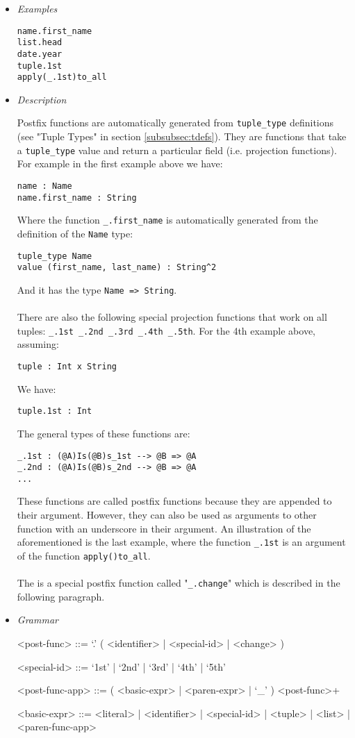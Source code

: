 \documentclass{article}
\begin{document}
\begin{itemize}

\item \textit{Examples}
\begin{verbatim}
name.first_name
list.head
date.year
tuple.1st
apply(_.1st)to_all
\end{verbatim}

\item \textit{Description} 

Postfix functions are automatically generated from \texttt{tuple_type}
definitions (see "Tuple Types" in section \ref{subsubsec:tdefs}). They are
functions that take a \texttt{tuple_type} value and return a particular field
(i.e. projection functions). For example in the first example above we have:
\begin{verbatim}
name : Name
name.first_name : String
\end{verbatim}
Where the function \texttt{_.first_name} is automatically generated from the
definition of the \texttt{Name} type:
\begin{verbatim}
tuple_type Name
value (first_name, last_name) : String^2
\end{verbatim}
And it has the type \texttt{Name => String}.
\\\\
There are also the following special projection functions that work on all tuples:
\texttt{_.1st _.2nd _.3rd _.4th _.5th}.
For the 4th example above, assuming:
\begin{verbatim}
tuple : Int x String
\end{verbatim}
We have:
\begin{verbatim}
tuple.1st : Int
\end{verbatim}
The general types of these functions are:
\begin{verbatim}
_.1st : (@A)Is(@B)s_1st --> @B => @A
_.2nd : (@A)Is(@B)s_2nd --> @B => @A
...
\end{verbatim}
These functions are called postfix functions because they are appended to their
argument. However, they can also be used as arguments to other function with an
underscore in their argument.  An illustration of the aforementioned is the
last example, where the function \texttt{_.1st} is an argument of the function
\texttt{apply()to_all}.
\\\\
The is a special postfix function called "\texttt{_.change}" which is described in
the following paragraph.

\item \textit{Grammar}
\begin{grammar}
<post-func> ::= `.' ( <identifier> | <special-id> | <change> )

<special-id> ::= `1st' | `2nd' | `3rd' | `4th' | `5th'

<post-func-app> ::= ( <basic-expr> | <paren-expr> | `_' ) <post-func>+

<basic-expr> ::=
<literal> | <identifier> | <special-id> | <tuple> | <list> | <paren-func-app>
\end{grammar}

\end{itemize}
\end{document}
